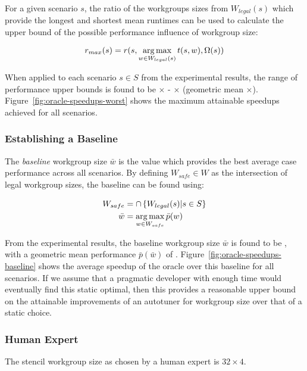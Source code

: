 For a given scenario $s$, the ratio of the workgroups sizes from
$W_{legal}(s)$ which provide the longest and shortest mean runtimes
can be used to calculate the upper bound of the possible performance
influence of workgroup size:

\begin{equation}
r_{max}(s) = r(s, \operatorname*{arg\,max}_{w \in W_{legal}(s)} t(s,w), \Omega(s))
\end{equation}

When applied to each scenario $s \in S$ from the experimental results,
the range of performance upper bounds is found to be
$\times$ -
$\times$ (geometric mean
$\times$). Figure~\ref{fig:oracle-speedups-worst}
shows the maximum attainable speedups achieved for all scenarios.


\subsubsection{Establishing a Baseline}

The \emph{baseline} workgroup size $\bar{w}$ is the value which
provides the best average case performance across all scenarios.  By
defining $W_{safe} \in W$ as the intersection of legal workgroup
sizes, the baseline can be found using:

\begin{align}
W_{safe} &= \cap \left\{ W_{legal}(s) | s \in S \right\}\\
\bar{w} &= \operatorname*{arg\,max}_{w \in W_{safe}} \bar{p}(w)
\end{align}

From the experimental results, the baseline workgroup size $\bar{w}$
is found to be , with a geometric mean performance
$\bar{p}(\bar{w})$ of
. Figure~\ref{fig:oracle-speedups-baseline}
shows the average speedup of the oracle over this baseline for all
scenarios. If we assume that a pragmatic developer with enough time
would eventually find this static optimal, then this provides a
reasonable upper bound on the attainable improvements of an autotuner
for workgroup size over that of a static choice.


\subsubsection{Human Expert}

The stencil workgroup size as chosen by a human expert is
$32 \times 4$.


